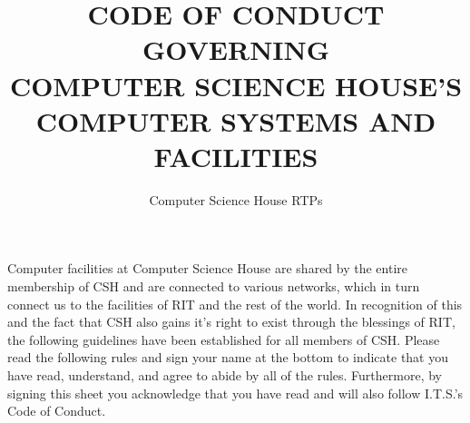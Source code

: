 \documentclass{article}
\title{
CODE OF CONDUCT GOVERNING\\
\textbf{COMPUTER SCIENCE HOUSE'S}\\
COMPUTER SYSTEMS AND FACILITIES}
\author{Computer Science House RTPs}
\date{\datechanged}
\begin{document}
\maketitle

Computer facilities at Computer Science House are shared by the entire membership of CSH and are connected to various networks, which in turn connect us to the facilities of RIT and the rest of the world. In recognition of this and the fact that CSH also gains it's right to exist through the blessings of RIT, the following guidelines have been established for all members of CSH. Please read the following rules and sign your name at the bottom to indicate that you have read, understand, and agree to abide by all of the rules. Furthermore, by signing this sheet you acknowledge that you have read and will also follow I.T.S.'s Code of Conduct.
\end{document}

